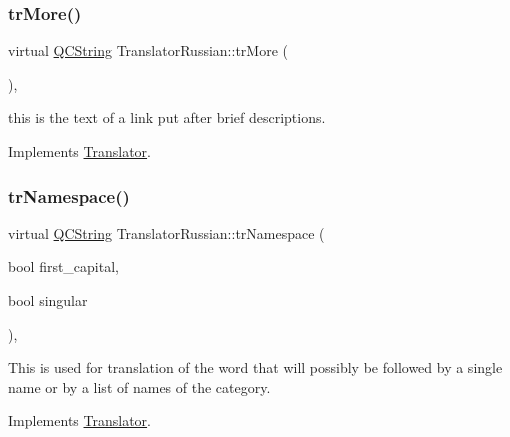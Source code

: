 \mbox{\label{class_translator_russian_a0f465ca0d7a1c2310e802a38f8a1296b}} 
\subsubsection{\texorpdfstring{trMore()}{trMore()}}
{\footnotesize\ttfamily virtual \mbox{\hyperlink{class_q_c_string}{Q\+C\+String}} Translator\+Russian\+::tr\+More (\begin{DoxyParamCaption}{ }\end{DoxyParamCaption})\hspace{0.3cm}{\ttfamily [inline]}, {\ttfamily [virtual]}}

this is the text of a link put after brief descriptions. 

Implements \mbox{\hyperlink{class_translator}{Translator}}.

\mbox{\label{class_translator_russian_a3d87287f0c4e4f09081dd983558a68a0}} 
\subsubsection{\texorpdfstring{trNamespace()}{trNamespace()}}
{\footnotesize\ttfamily virtual \mbox{\hyperlink{class_q_c_string}{Q\+C\+String}} Translator\+Russian\+::tr\+Namespace (\begin{DoxyParamCaption}\item[{bool}]{first\+\_\+capital,  }\item[{bool}]{singular }\end{DoxyParamCaption})\hspace{0.3cm}{\ttfamily [inline]}, {\ttfamily [virtual]}}

This is used for translation of the word that will possibly be followed by a single name or by a list of names of the category. 

Implements \mbox{\hyperlink{class_translator}{Translator}}.

\mbox{\label{class_translator_russian_a2c227d9e8637c0fbc8d4480bf0dfbef3}} 
